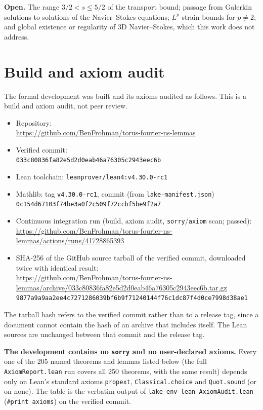 \documentclass[11pt]{article}
\theoremstyle{remark}\newtheorem*{commentary}{Commentary}
\begin{document}
\textbf{Open.} The range $3/2<s\le5/2$ of the transport bound; passage from Galerkin solutions to
solutions of the Navier--Stokes equations; $L^p$ strain bounds for $p\ne2$; and global existence or
regularity of 3D Navier--Stokes, which this work does not address.
\appendix
\section{Build and axiom audit}\label{app:build-axiom-audit}

The formal development was built and its axioms audited as follows. This is a build and axiom audit, not peer review.

{\raggedright
\begin{itemize}
\item Repository:\\ {\footnotesize\url{https://github.com/BenFrohman/torus-fourier-ns-lemmas}}
\item Verified commit:\\ {\footnotesize\texttt{033c80836fa82e5d2d0eab46a76305c2943eec6b}}
\item Lean toolchain: \texttt{leanprover/lean4:v4.30.0-rc1}
\item Mathlib: tag \texttt{v4.30.0-rc1}, commit (from \texttt{lake-manifest.json})\\ {\footnotesize\texttt{0c154d67103f74be3a0f2c509f72ccbf5be9f2a7}}
\item Continuous integration run (build, axiom audit, \texttt{sorry}/\texttt{axiom} scan; passed):\\ {\footnotesize\url{https://github.com/BenFrohman/torus-fourier-ns-lemmas/actions/runs/41728865393}}
\item SHA-256 of the GitHub source tarball of the verified commit, downloaded twice with identical result:\\ {\footnotesize\url{https://github.com/BenFrohman/torus-fourier-ns-lemmas/archive/033c80836fa82e5d2d0eab46a76305c2943eec6b.tar.gz}}\\
{\footnotesize\texttt{9877a9a9aa2ee4c7271286039bf6b9f71240144f76c1dc87f4d0ce7998d38ae1}}
\end{itemize}\par}

The tarball hash refers to the verified commit rather than to a release tag, since a document cannot contain the hash of an archive that includes itself. The Lean sources are unchanged between that commit and the release tag.

\textbf{The development contains no \texttt{sorry} and no user-declared axioms.} Every one of the 205 named theorems and lemmas listed below (the full \texttt{AxiomReport.lean} run covers all 250 theorems, with the same result) depends only on Lean's standard axioms \texttt{propext}, \texttt{Classical.choice} and \texttt{Quot.sound} (or on none). The table is the verbatim output of \texttt{lake env lean AxiomAudit.lean} (\texttt{\#print axioms}) on the verified commit.
\end{document}
